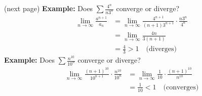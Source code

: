 \documentclass{report}
\begin{document}
(next page)
\newpage
\noindent\textbf{Example:} Does $\sum\frac{4^n}{n3^n}$ converge or diverge?
\begin{align*}
\lim_{n\to\infty}\frac{a^{n+1}}{a_n}&=\lim_{n\to\infty}\frac{4^{n+1}}{(n+1)3^{n+1}}\cdot
\frac{n3^n}{4^n}\\
&=\lim_{n\to\infty}\frac{4n}{3(n+1)}\\
&=\frac{4}{3}>1\quad\text{(diverges)}
\end{align*}
\textbf{Example:} Does $\sum\frac{n^10}{10^n}$ converge or diverge?
\begin{align*}
\lim_{n\to\infty}\frac{(n+1)^{10}}{10^{n+1}}\cdot\frac{n^{10}}{10^n}
&=\lim_{n\to\infty}\frac{1}{10}\cdot\frac{(n+1)^{10}}{n^{10}}\\
&=\frac{1}{10}<1\quad\text{(converges)}
\end{align*}
\newpage
\end{document}

